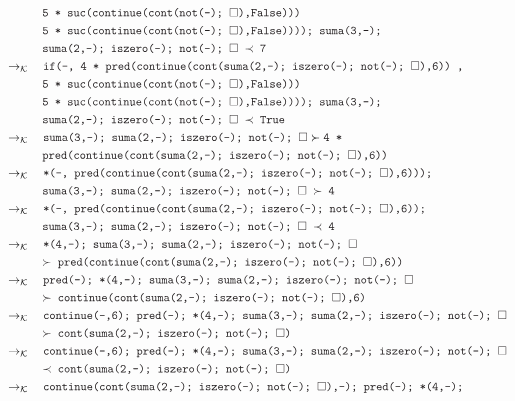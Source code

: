 \documentclass{article}
\newcommand{\tx}[1]{\textcolor{Black} {\texttt{#1}}}
\newcommand{\es}{$\square$}
\newcommand{\pop}[2]{ \tx{#1} \succ \tx{#2}}
\newcommand{\kr}{\rightarrow_{\mathcal{K}} \quad}
\begin{document}
\begin{enumerate}
\begin{enumerate}
\begin{align*}
			&\tx{\quad \quad \quad 5 * suc(continue(cont(not(-); \es),False)))}\\
			&\tx {\quad \quad \quad 5 * suc(continue(cont(not(-); \es),False)))); suma(3,-);}\\
			&\tx{\quad \quad \quad suma(2,-); iszero(-); not(-); \es $\ \prec $ 7} \\
			&\kr \tx{if(-, 4 * pred(continue(cont(suma(2,-); iszero(-); not(-); \es),6)) ,}\\
			&\tx{\quad \quad \quad 5 * suc(continue(cont(not(-); \es),False)))}\\
			&\tx {\quad \quad \quad 5 * suc(continue(cont(not(-); \es),False)))); suma(3,-);}\\
			&\tx{\quad \quad \quad suma(2,-); iszero(-); not(-); \es $\ \prec $ True} \\			
			&\kr \pop{suma(3,-); suma(2,-); iszero(-); not(-); \es} {4 *}\\
			&\tx{\quad \quad \quad pred(continue(cont(suma(2,-); iszero(-); not(-); \es),6))} \\
			&\kr \tx{*(-, pred(continue(cont(suma(2,-); iszero(-); not(-); \es),6)));}\\
			&\tx{\quad \quad \quad suma(3,-); suma(2,-); iszero(-); not(-); \es $\ \succ $ 4}\\
			&\kr \tx{*(-, pred(continue(cont(suma(2,-); iszero(-); not(-); \es),6));}\\
			&\tx{\quad \quad \quad suma(3,-); suma(2,-); iszero(-); not(-); \es $\ \prec $ 4}\\
			&\kr \tx{*(4,-); suma(3,-); suma(2,-); iszero(-); not(-); \es}\\
			&\tx{\quad \quad \quad $\succ $ pred(continue(cont(suma(2,-); iszero(-); not(-); \es),6))}\\
			&\kr \tx{pred(-); *(4,-); suma(3,-); suma(2,-); iszero(-); not(-); \es}\\
			&\tx{\quad \quad \quad $\succ $ continue(cont(suma(2,-); iszero(-); not(-); \es),6)}\\
			&\kr \tx{continue(-,6); pred(-); *(4,-); suma(3,-); suma(2,-); iszero(-); not(-); \es}\\
			&\tx{\quad \quad \quad $\succ $ cont(suma(2,-); iszero(-); not(-); \es)}\\
			&\kr \tx{continue(-,6); pred(-); *(4,-); suma(3,-); suma(2,-); iszero(-); not(-); \es}\\
			&\tx{\quad \quad \quad $\prec $ cont(suma(2,-); iszero(-); not(-); \es)}\\
			&\kr \tx{continue(cont(suma(2,-); iszero(-); not(-); \es),-); pred(-); *(4,-);}\\

\end{align*}
\end{enumerate}
\end{enumerate}
\end{document}
